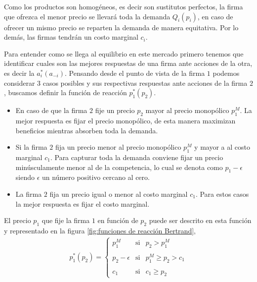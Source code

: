 Como los productos son homogéneos, es decir son sustitutos perfectos, la firma que ofrezca el menor precio se llevará toda la demanda $Q_i(p_i)$, en caso de ofrecer un mismo precio se reparten la demanda de manera equitativa. Por lo demás, las firmas tendrán un costo marginal $c_i$. 

Para entender como se llega al equilibrio en este mercado primero tenemos que identificar cuales son las mejores respuestas de una firma ante acciones de la otra, es decir la $a^*_i(a_{-i})$. Pensando desde el punto de vista de la firma $1$ podemos considerar 3 casos posibles y sus respectivas respuestas ante acciones de la firma $2$, buscamos definir la función de reacción $p^*_1(p_2)$.

\begin{itemize}
    \item En caso de que la firma $2$ fije un precio $p_2$ mayor al precio monopólico $p_1^M$. La mejor respuesta es fijar el precio monopólico, de esta manera maximizan beneficios mientras absorben toda la demanda.
    \item Si la firma $2$ fija un precio menor al precio monopólico $p_1^M$ y mayor a al costo marginal $c_1$. Para capturar toda la demanda conviene fijar un precio minúsculamente menor al de la competencia, lo cual se denota como $p_1-\epsilon$ siendo $\epsilon$ un número positivo cercano al cero.
    \item La firma $2$ fija un precio igual o menor al costo marginal $c_1$. Para estos casos la mejor respuesta es fijar el costo marginal.
\end{itemize}

El precio $p_1$ que fije la firma $1$ en función de $p_2$ puede ser descrito en esta función y representado en la figura \ref{fig:funciones de reacción Bertrand},
\begin{align*}
    p^*_1(p_2)= \left\{ \begin{array}{lcc} p_1^M & \text{si} &  p_2> p_1^M \\ \\ p_2-\epsilon & \text{si} & p_1^M \geq p_2>c_1 \\ \\ c_1 & \text{si} & c_1 \geq p_2 \end{array} \right.
\end{align*}

